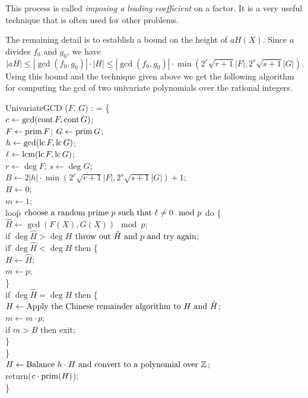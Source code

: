 This process is called {\em imposing a leading
coefficient} on a factor.  It is
a very useful technique that is often used for other problems.

The remaining detail is to establish a bound on the height of $aH(X)$.
Since $a$ divides $f_0$ and $g_0$, we have 
\[
|a H| \le |\gcd(f_0, g_0)| \cdot |H| 
  \le |\gcd(f_0, g_0)| \cdot \min( 2^r\sqrt{r+1} |F|, 2^s\sqrt{s+1}
|G|).
\]
Using this bound and the technique given above we get the following
algorithm for computing the {\sc gcd} of two univariate polynomials over the
rational integers.

\begindsacode
UnivariateGCD ($F$, $G$) : = \{ \\
\> $c \leftarrow \gcd(\operatorname{cont} F, \operatorname{cont} G)$; \\
\> $F \leftarrow \operatorname{prim} F$; $G \leftarrow \operatorname{prim} G$; \\
\> $h \leftarrow \gcd(\operatorname{lc} F, \operatorname{lc} G)$; \\
\> $\ell \leftarrow \mathop{\rm lcm}\nolimits(\operatorname{lc} F, \operatorname{lc} G)$; \\
\> $r \leftarrow \deg F$; $s \leftarrow \deg G$; \\
\> $B \leftarrow 2 |h| \cdot \min( 2^r\sqrt{r+1} |F|, 2^s\sqrt{s+1}
|G|) + 1$; \\
\> $H \leftarrow 0$; \\
\> $m \leftarrow 1$; \\
\> loo\=p $\mbox{\rm choose a random prime $p$ such that $\ell \not=0 \mod{p}$}$ do \{ \\
\>\> $\hat{H} \leftarrow \gcd(F(X), G(X)) \mod{p}$; \\
\>\> if $\deg \hat{H} > \deg H$ $\mbox{\rm throw out $\hat{H}$ and $p$
and try again}$; \\
\>\> if \=$\deg \hat{H} < \deg H$ then \{ \\
\>\>\> $H \leftarrow \hat{H}$; \\
\>\>\> $m \leftarrow p$; \\
\>\>\> \} \\
\>\> if $\deg \hat{H} = \deg H$ then \{ \\
\>\>\> $H \leftarrow \mbox{\rm Apply the Chinese remainder algorithm to $H$
and $\hat{H}$}$; \\
\>\>\> $m \leftarrow m \cdot p$; \\
\>\>\> if $m > B$ then exit; \\
\>\>\> \} \\
\>\>\} \\
\> $H \leftarrow \mbox{\rm Balance $h \cdot H$ and convert to a polynomial
over $\mathbb{Z}$}$; \\
\> return($c \cdot \operatorname{prim}(H)$); \\
\> \}
\enddsacode

